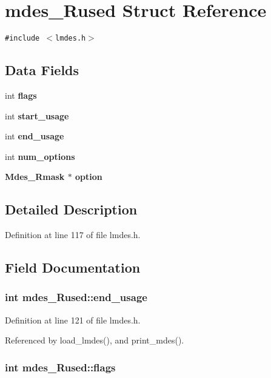 \section{mdes\_\-Rused Struct Reference}
\label{structmdes__Rused}
{\tt \#include $<$lmdes.h$>$}

\subsection*{Data Fields}
\begin{CompactItemize}
\item 
int \bf{flags}
\item 
int \bf{start\_\-usage}
\item 
int \bf{end\_\-usage}
\item 
int \bf{num\_\-options}
\item 
\bf{Mdes\_\-Rmask} $\ast$ \bf{option}
\end{CompactItemize}


\subsection{Detailed Description}




Definition at line 117 of file lmdes.h.

\subsection{Field Documentation}
\subsubsection{\setlength{\rightskip}{0pt plus 5cm}int \bf{mdes\_\-Rused::end\_\-usage}}\label{structmdes__Rused_27e100be1ef1ebee7a56b770f342d011}




Definition at line 121 of file lmdes.h.

Referenced by load\_\-lmdes(), and print\_\-mdes().
\subsubsection{\setlength{\rightskip}{0pt plus 5cm}int \bf{mdes\_\-Rused::flags}}\label{structmdes__Rused_a47bf2b0a2f43df2f9faffddba1e907f}




